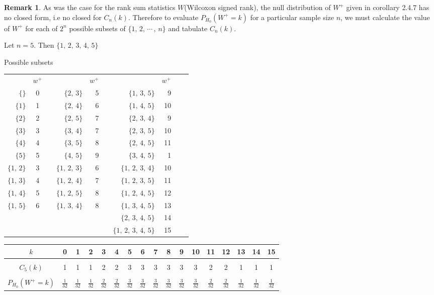 \documentclass[12pt,a4paper]{report}
\theoremstyle{definition}
\newtheorem{remark}[thm]{Remark}
\theoremstyle{plain}
\begin{document}
\begin{remark}
As was the case for the rank sum statistics $W$(Wilcoxon signed rank), the null distribution of $W^+$ given in corollary 2.4.7 has no closed form, i.e no closed for $C_n(k)$. Therefore to evaluate $P_{H_0}(W^+ = k)$  for a particular sample size $n$, we must calculate the value of $W^+$ for each of $2^n$ possible subsets of $\{1, \, 2, \, \cdots\, , \, n\}$ and tabulate $C_n(k)$.\\
\end{remark}

Let $n = 5$. Then $\{1, \, 2, \, 3, \, 4, \, 5\}$
\begin{table}[H]
\centering
Possible subsets\\
\begin{tabular}{rccrrcrrrc}
       & $w^+$&&& $w^+$ && & $w^+$\\
$\{\}$ & 0&& $\{2,\, 3\}$ & 5 && $\{1,\, 3,\, 5\}$ & 9\\
$\{1\}$ & 1&& $\{2, \, 4\}$ & 6 && $\{1, \, 4, \, 5\}$ & 10\\
$\{2\}$ & 2&& $\{2,\, 5\}$ & 7 && $\{2, \, 3,\, 4\}$ & 9\\
$\{3\}$ & 3&& $\{3,\, 4\}$ & 7 && $\{2,\, 3, \, 5\}$ & 10\\
$\{4\}$ & 4&& $\{3,\, 5\}$ & 8 && $\{2, \, 4, \, 5\}$ & 11 \\
$\{5\}$ & 5&& $\{4,\, 5\}$ & 9 && $\{3,\, 4,\, 5\}$ & 1\\
$\{1,\, 2\}$ & 3&& $\{1, \, 2, \, 3\}$ & 6 && $\{1, \, 2, \, 3, \, 4\}$ & 10\\
$\{1,\, 3\}$ & 4&& $\{1, \, 2, \, 4\}$ & 7 && $\{1, \, 2, \, 3, \, 5\}$ & 11\\
$\{1, \, 4\}$ & 5&& $\{1, \, 2,\, 5\}$ & 8 && $\{1, \, 2, \, 4, \, 5\}$ & 12\\
$\{1,\, 5\}$ & 6&& $\{1, \, 3,\, 4\}$ & 8 && $\{1, \, 3, \, 4, \, 5\}$ & 13\\
             & &&                     &  && $\{2,\, 3, \, 4, \, 5\}$ & 14\\
             & &&                     & &&   $\{1, \, 2,\, 3, \, 4, \, 5\}$ & 15\\
\end{tabular}
\end{table}
 
 \begin{table}[H]
 \centering
 \begin{tabular}{c|cccccccccccccccc}
 $k$ & 0 & 1 & 2 & 3 & 4 & 5 & 6 & 7 & 8 & 9 & 10 & 11 & 12 & 13 & 14 & 15\\
 \hline
 &&&&&&&&&&&&&&&&\\
 $C_5(k)$ & 1 & 1 & 1 & 2 & 2 & 3 & 3 & 3 & 3 & 3 & 3 & 2 & 2 & 1 & 1 & 1\\
 &&&&&&&&&&&&&&&&\\
 $P_{H_0}(W^+ = k)$ & $\frac{1}{32}$ & $\frac{1}{32}$ & $\frac{1}{32}$ & $\frac{2}{32}$ & $\frac{2}{32}$ & $\frac{3}{32}$  & $\frac{3}{32}$ & $\frac{3}{32}$ & $\frac{3}{32}$ & $\frac{3}{32}$ & $\frac{3}{32}$ & $\frac{2}{32}$ & $\frac{2}{32}$ & $\frac{1}{32}$ & $\frac{1}{32}$ & $\frac{1}{32}$\\
 \end{tabular}
 \end{table}
\end{document}
